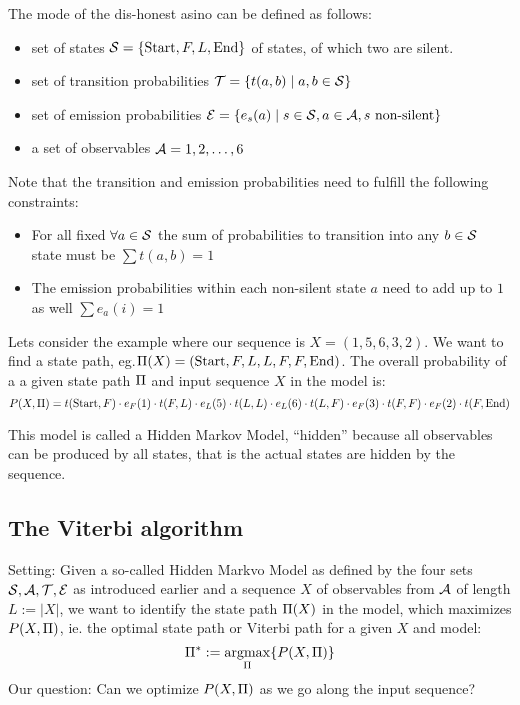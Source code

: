 The mode of the dis-honest asino can be defined as follows:
\begin{itemize}
\item set of states \(\mathcal{S}=\{\text{Start},F,L,\text{End}\}\) of states,
  of which two are silent.
\item set of transition probabilities
  \(\mathcal{T} = \{ t(a,b) \mid a,b\in\mathcal{S} \}\)
\item set of emission probabilities
  \(\mathcal{E} = \{ e_s(a) \mid s\in\mathcal{S}, a\in\mathcal{A}, s\text{ non-silent} \}\)
\item a set of observables \(\mathcal{A} = {1,2,\dotsc,6}\)
\end{itemize}

Note that the transition and emission probabilities need to fulfill the
following constraints:
\begin{itemize}
\item For all fixed \(\forall a\in\mathcal{S}\) the sum of probabilities to
  transition into any \(b\in\mathcal{S}\) state must be \(\sum t(a,b) = 1\)
\item The emission probabilities within each non-silent state \(a\) need to add
  up to \(1\) as well
  \(\sum e_a(i) = 1\)
\end{itemize}

Lets consider the example where our sequence is \(X=(1,5,6,3,2)\).  We want to
find a state path, eg.\@ \(\Pi(X)=(\text{Start},F,L,L,F,F,\text{End})\).  The
overall probability of a a given state path \(\Pi\) and input sequence \(X\)
in the model is:
\[
    P(X,\Pi) = t(\text{Start},F) \cdot
                 e_F(1) \cdot t(F,L) \cdot
                 e_L(5) \cdot t(L,L) \cdot
                 e_L(6) \cdot t(L,F) \cdot
                 e_F(3) \cdot t(F,F) \cdot
                 e_F(2) \cdot t(F,\text{End})
\]

This model is called a Hidden Markov Model, \enquote{hidden} because all
observables can be produced by all states, that is the actual states are
hidden by the sequence.

\subsection{The Viterbi algorithm}

Setting: Given a so-called Hidden Markvo Model as defined by the four sets
\(\mathcal{S},\mathcal{A},\mathcal{T},\mathcal{E}\) as introduced earlier and a sequence \(X\)
of observables from \(\mathcal{A}\) of length \(L := |X|\), we want to identify the
state path \(\Pi(X)\) in the model, which maximizes \(P(X,\Pi)\), ie.\@
the optimal state path or Viterbi path for a given \(X\) and model:
\[
    \Pi^* := \operatorname*{argmax}_{\Pi} \{ P(X,\Pi) \}
\]
Our question: Can we optimize \(P(X,\Pi)\) as we go along the input sequence?

